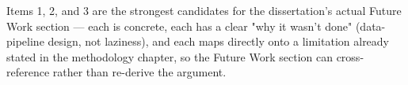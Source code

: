 Items 1, 2, and 3 are the strongest candidates for the dissertation's actual Future Work section — each is concrete, each has a clear "why it wasn't done" (data-pipeline design, not laziness), and each maps directly onto a limitation already stated in the methodology chapter, so the Future Work section can cross-reference rather than re-derive the argument.
